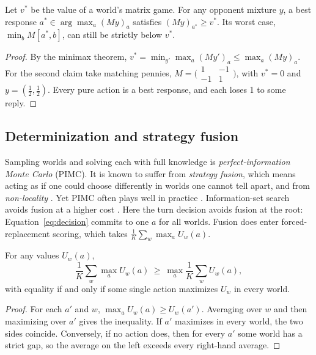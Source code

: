 \begin{proposition}
\label{prop:br}
Let $v^*$ be the value of a world's matrix game. For any opponent mixture $y$,
a best response $a^*\in\arg\max_a(My)_a$ satisfies $(My)_{a^*}\ge v^*$. Its
worst case, $\min_bM[a^*,b]$, can still be strictly below $v^*$.
\end{proposition}
\begin{proof}
By the minimax theorem, $v^*=\min_{y'}\max_a(My')_a\le\max_a(My)_a$. For the
second claim take matching pennies, $M=\bigl(\begin{smallmatrix}1&-1\\-1&1\end{smallmatrix}\bigr)$,
with $v^*=0$ and $y=(\tfrac12,\tfrac12)$. Every pure action is a best response,
and each loses 1 to some reply.
\end{proof}


\subsection{Determinization and strategy fusion}
\label{sec:fusion}
Sampling worlds and solving each with full knowledge is \emph{perfect-information
Monte Carlo} (PIMC). It is known to suffer from \emph{strategy fusion}, which
means acting as if one could choose differently in worlds one cannot tell
apart, and from \emph{non-locality} \citep{frankbasin1998}. Yet PIMC often
plays well in practice \citep{long2010}. Information-set search avoids fusion
at a higher cost \citep{cowling2012}. Here the turn decision avoids fusion at
the root: Equation~\eqref{eq:decision} commits to one $a$ for all worlds.
Fusion does enter forced-replacement scoring, which takes
$\frac1K\sum_w\max_aU_w(a)$.

\begin{proposition}
\label{prop:fusion}
For any values $U_w(a)$,
\[
  \frac1K\sum_w\max_aU_w(a)\ \ge\ \max_a\frac1K\sum_wU_w(a),
\]
with equality if and only if some single action maximizes $U_w$ in every world.
\end{proposition}
\begin{proof}
For each $a'$ and $w$, $\max_aU_w(a)\ge U_w(a')$. Averaging over $w$ and then
maximizing over $a'$ gives the inequality. If $a'$ maximizes in every world,
the two sides coincide. Conversely, if no action does, then for every $a'$
some world has a strict gap, so the average on the left exceeds every
right-hand average.
\end{proof}

